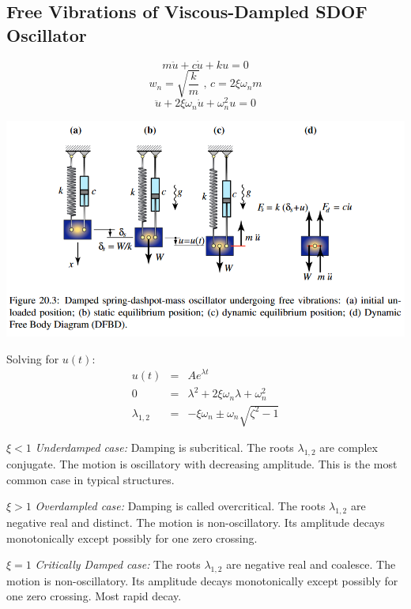 \documentclass{article}
\begin{document}
\begin{multicols*}{2}
    \newpage
    \subsection*{Free Vibrations of Viscous-Dampled SDOF Oscillator}
    $$\boxed{m\ddot{u}+c\dot{u}+ku=0}$$
    $$w_n=\sqrt{\frac{k}{m}} \text{ , } c=2\xi\omega_nm$$
    $$\boxed{\ddot{u}+2\xi\omega_n\dot{u}+\omega_n^2u=0}$$

    \includegraphics[width=\linewidth]{Figures/SDOF_Ddamped.png}

    Solving for $u(t)$:
    \begin{equation*}
        \begin{array}{lll}
            u(t) & = & Ae^{\lambda t}\\
            0 & = & \lambda^2+2\xi\omega_n\lambda+\omega_n^2\\
            \lambda_{1,2} & = & -\xi\omega_n\pm\omega_n\sqrt{\zeta^2-1}
        \end{array}
    \end{equation*}

    $\xi<1$ \textit{Underdamped case:} Damping is subcritical. The roots $\lambda_{1,2}$
    are complex conjugate. The motion is oscillatory with decreasing amplitude.
    This is the most common case in typical structures.\par 
    $\xi>1$ \textit{Overdampled case:} Damping is called overcritical. The roots
    $\lambda_{1,2}$ are negative real and distinct. The motion is non-oscillatory.
    Its amplitude decays monotonically except possibly for one zero crossing.\par 
    $\xi=1$ \textit{Critically Damped case:} The roots $\lambda_{1,2}$ are negative
    real and coalesce. The motion is non-oscillatory. Its amplitude decays monotonically
    except possibly for one zero crossing. Most rapid decay.


\end{multicols*}
\end{document}
